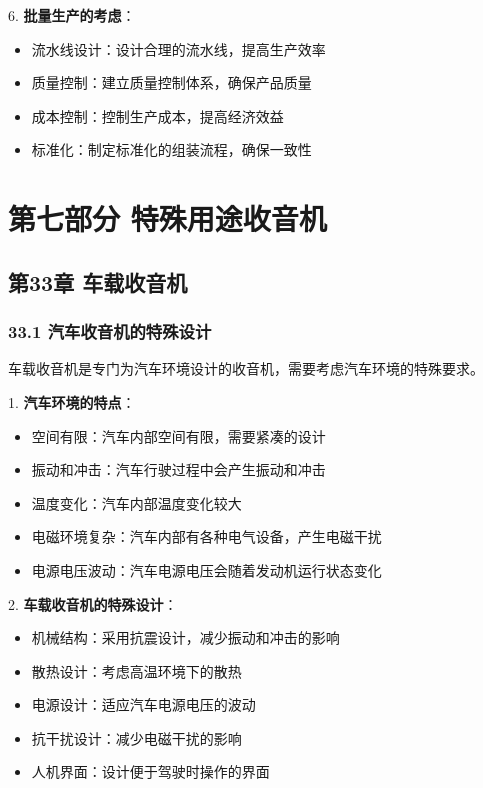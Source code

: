 \documentclass[12pt,UTF8]{ctexbook}
\begin{document}
6. \textbf{批量生产的考虑}：
   \begin{itemize}[leftmargin=3.5em]
   \item 流水线设计：设计合理的流水线，提高生产效率
   \item 质量控制：建立质量控制体系，确保产品质量
   \item 成本控制：控制生产成本，提高经济效益
   \item 标准化：制定标准化的组装流程，确保一致性
   \end{itemize}

\part*{第七部分 特殊用途收音机}

\chapter*{第33章 车载收音机}
\section*{33.1 汽车收音机的特殊设计}

车载收音机是专门为汽车环境设计的收音机，需要考虑汽车环境的特殊要求。

1. \textbf{汽车环境的特点}：
   \begin{itemize}[leftmargin=3.5em]
   \item 空间有限：汽车内部空间有限，需要紧凑的设计
   \item 振动和冲击：汽车行驶过程中会产生振动和冲击
   \item 温度变化：汽车内部温度变化较大
   \item 电磁环境复杂：汽车内部有各种电气设备，产生电磁干扰
   \item 电源电压波动：汽车电源电压会随着发动机运行状态变化
   \end{itemize}

2. \textbf{车载收音机的特殊设计}：
   \begin{itemize}[leftmargin=3.5em]
   \item 机械结构：采用抗震设计，减少振动和冲击的影响
   \item 散热设计：考虑高温环境下的散热
   \item 电源设计：适应汽车电源电压的波动
   \item 抗干扰设计：减少电磁干扰的影响
   \item 人机界面：设计便于驾驶时操作的界面
   \end{itemize}
\end{document}
